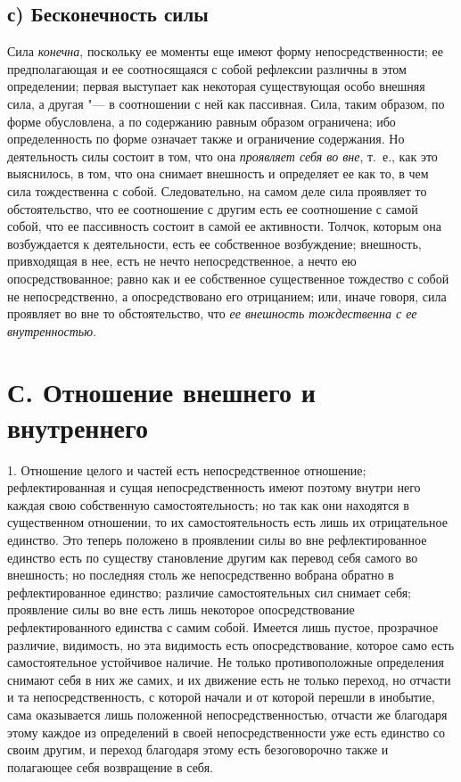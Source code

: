 \subsection[с) Бесконечность силы]{с) Бесконечность силы}

Сила {\em конечна},
поскольку ее моменты еще имеют форму непосредственности; ее предполагающая
и ее соотносящаяся с собой рефлексии различны в этом определении; первая
выступает как некоторая существующая особо внешняя сила, а другая "--- в
соотношении с ней как пассивная. Сила, таким образом, по форме обусловлена,
а по содержанию равным образом ограничена; ибо определенность по форме
означает также и ограничение содержания. Но деятельность силы состоит в
том, что она {\em проявляет себя во вне}, т.~е., как
это выяснилось, в том, что она снимает внешность и определяет ее как то, в
чем сила тождественна с собой. Следовательно, на самом деле сила проявляет
то обстоятельство, что ее соотношение с другим есть ее соотношение с самой
собой, что ее пассивность состоит в самой ее активности. Толчок, которым
она возбуждается к деятельности, есть ее собственное возбуждение;
внешность, привходящая в нее, есть не нечто непосредственное, а нечто ею
опосредствованное; равно как и ее собственное существенное тождество с
собой не непосредственно, а опосредствовано его отрицанием; или, иначе
говоря, сила проявляет во вне то обстоятельство, что
{\em ее внешность тождественна с ее
внутренностью}.


\section[С. Отношение внешнего и внутреннего]
{С. Отношение внешнего и внутреннего}

1. Отношение целого и частей есть
непосредственное отношение; рефлектированная и сущая непосредственность
имеют поэтому внутри него каждая свою собственную самостоятельность; но так
как они находятся в существенном отношении, то их самостоятельность есть
лишь их отрицательное единство. Это теперь положено в проявлении силы во
вне рефлектированное единство есть по существу становление другим как
перевод себя самого во внешность; но последняя столь же непосредственно
вобрана обратно в рефлектированное единство; различие самостоятельных сил
снимает себя; проявление силы во вне есть лишь некоторое опосредствование
рефлектированного единства с самим собой. Имеется лишь пустое, прозрачное
различие, видимость, но эта видимость есть опосредствование, которое само
есть самостоятельное устойчивое наличие. Не только противоположные
определения снимают себя в них же самих, и их движение есть не только
переход, но отчасти и та непосредственность, с которой начали и от которой
перешли в инобытие, сама оказывается лишь положенной непосредственностью,
отчасти же благодаря этому каждое из определений в своей непосредственности
уже есть единство со своим другим, и переход благодаря этому есть
безоговорочно также и полагающее себя возвращение в себя.

